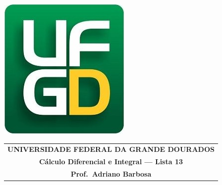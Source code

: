 \documentclass[a4paper,5pt]{amsbook}
\begin{document}
\thispagestyle{empty}
\pagestyle{empty}
\begin{minipage}[h]{0.14\textwidth}
	\includegraphics[scale=0.24]{../../ufgd.png}
\end{minipage}
\begin{minipage}[h]{\textwidth}
\begin{tabular}{c}
{{\bf UNIVERSIDADE FEDERAL DA GRANDE DOURADOS}}\\
{{\bf C\'alculo Diferencial e Integral --- Lista 13}}\\
{{\bf Prof.\ Adriano Barbosa}}\\
\end{tabular}
\vspace{-0.45cm}
%
\end{minipage}

\end{document}

